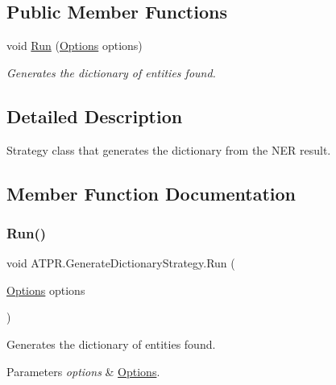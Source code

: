\subsection*{Public Member Functions}
\begin{DoxyCompactItemize}
\item 
void \hyperlink{class_a_t_p_r_1_1_generate_dictionary_strategy_acec75993f2d1b9e2899130cd9dff1ffa}{Run} (\hyperlink{class_a_t_p_r_1_1_options}{Options} options)
\begin{DoxyCompactList}\small\item\em Generates the dictionary of entities found. \end{DoxyCompactList}\end{DoxyCompactItemize}


\subsection{Detailed Description}
Strategy class that generates the dictionary from the N\+ER result. 



\subsection{Member Function Documentation}
\hypertarget{class_a_t_p_r_1_1_generate_dictionary_strategy_acec75993f2d1b9e2899130cd9dff1ffa}{}\label{class_a_t_p_r_1_1_generate_dictionary_strategy_acec75993f2d1b9e2899130cd9dff1ffa} 
\subsubsection{\texorpdfstring{Run()}{Run()}}
{\footnotesize\ttfamily void A\+T\+P\+R.\+Generate\+Dictionary\+Strategy.\+Run (\begin{DoxyParamCaption}\item[{\hyperlink{class_a_t_p_r_1_1_options}{Options}}]{options }\end{DoxyParamCaption})\hspace{0.3cm}{\ttfamily [inline]}}



Generates the dictionary of entities found. 


\begin{DoxyParams}{Parameters}
{\em options} & \hyperlink{class_a_t_p_r_1_1_options}{Options}.\\
\hline
\end{DoxyParams}


